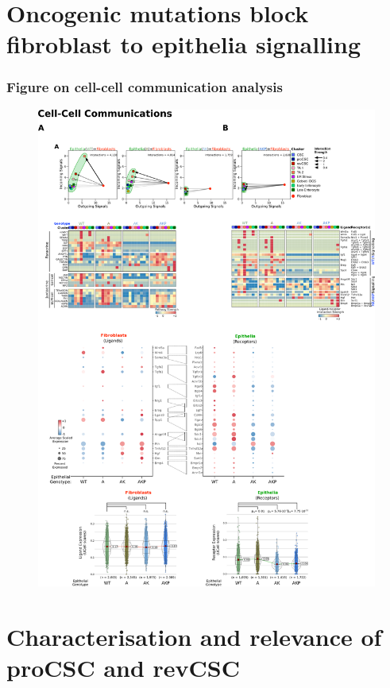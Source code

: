 \section{Oncogenic mutations block fibroblast to epithelia signalling}

\subsubsection{Figure on cell-cell communication analysis}

\begin{figure}
    \centering
    \includegraphics{04seq/figs/4SEQ_CC.png}
    \caption{}
    \label{fig:}
\end{figure}

\section{Characterisation and relevance of proCSC and revCSC}

